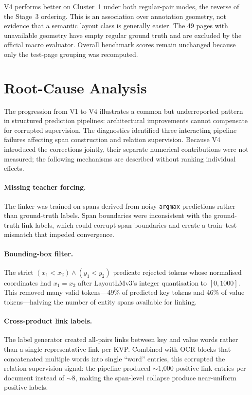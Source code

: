 V4 performs better on Cluster~1 under both regular-pair modes, the reverse of
the Stage~3 ordering. This is an association over annotation geometry, not
evidence that a semantic layout class is generally easier. The 49 pages with
unavailable geometry have empty regular ground truth and are excluded by the
official macro evaluator. Overall benchmark scores remain unchanged because
only the test-page grouping was recomputed.

\section{Root-Cause Analysis}
\label{sec:root-cause-analysis}

The progression from V1 to V4 illustrates a common but underreported pattern
in structured prediction pipelines: architectural improvements cannot
compensate for corrupted supervision.  The diagnostics identified three
interacting pipeline failures affecting span construction and relation
supervision.  Because V4 introduced the corrections jointly, their separate
numerical contributions were not measured; the following mechanisms are
described without ranking individual effects.

\paragraph{Missing teacher forcing.}
The linker was trained on spans derived from noisy \texttt{argmax} predictions
rather than ground-truth labels.  Span boundaries were inconsistent with the
ground-truth link labels, which could corrupt span boundaries and create a
train--test mismatch that impeded convergence.

\paragraph{Bounding-box filter.}
The strict $(x_1 < x_2) \wedge (y_1 < y_2)$ predicate rejected tokens whose
normalised coordinates had $x_1 = x_2$ after LayoutLMv3's integer
quantisation to $[0, 1000]$.  This removed many valid tokens---49\% of
predicted key tokens and 46\% of value tokens---halving the number of entity
spans available for linking.

\paragraph{Cross-product link labels.}
The label generator created all-pairs links between key and value words rather
than a single representative link per KVP.  Combined with OCR blocks that
concatenated multiple words into single ``word'' entries, this corrupted the
relation-supervision signal: the pipeline produced $\sim$1{,}000 positive link
entries per document instead of $\sim$8, making the span-level collapse
produce near-uniform positive labels.

